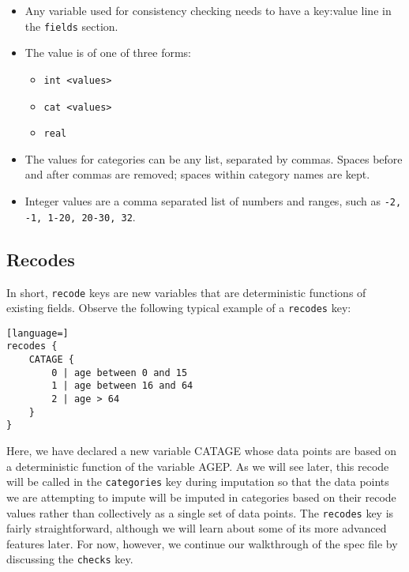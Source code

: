 \documentclass{article}
\begin{document}
\begin{itemize}
\item Any variable used for consistency checking needs to have a key:value line in the
{\tt fields} section.
\item The value is of one of three forms:
    \begin{itemize}
    \item {\tt int <values>}
    \item {\tt cat <values>}
    \item {\tt real}
    \end{itemize}
\item The values for categories can be any list, separated by commas. Spaces before and
after commas are removed; spaces within category names are kept. 
\item Integer values are a comma separated list of numbers and ranges, such as {\tt -2, -1, 1-20, 20-30, 32}.
\end{itemize}

%

\subsection{Recodes}
In short, {\tt recode} keys are new variables that are deterministic functions of 
existing fields. Observe the following typical example of a {\tt recodes} key:

\begin{lstlisting}[language=]
recodes {
    CATAGE {
        0 | age between 0 and 15
        1 | age between 16 and 64
        2 | age > 64
    }
}
\end{lstlisting}

Here, we have declared a new variable CATAGE whose data points are based on a
deterministic function of the variable AGEP. As we will see later, this recode will
be called in the {\tt categories} key during imputation so that the data points we are
attempting to impute will be imputed in categories based on their recode values rather
than collectively as a single set of data points. The {\tt recodes} key is fairly
straightforward, although we will learn about some of its more advanced features
later. For now, however, we continue our walkthrough of the spec file by discussing
the {\tt checks} key.
\end{document}
